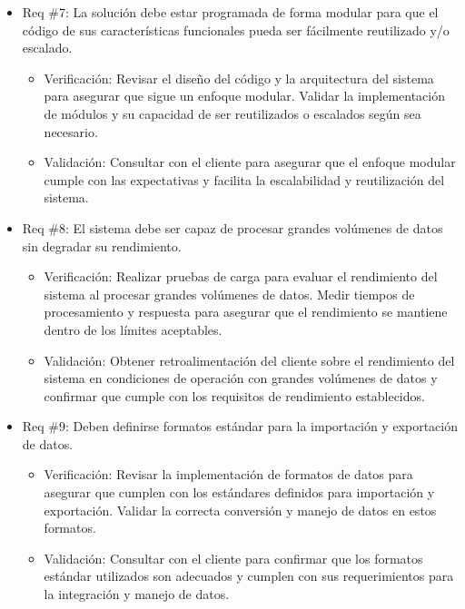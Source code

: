 \documentclass[
11pt, %
codirector, %
]{charter}
\begin{document}
\begin{itemize} 
\item Req \#7: La solución debe estar programada de forma modular para que el código de sus características funcionales pueda ser fácilmente reutilizado y/o escalado.

\begin{itemize}
	\item Verificación: Revisar el diseño del código y la arquitectura del sistema para asegurar que sigue un enfoque modular. Validar la implementación de módulos y su capacidad de ser reutilizados o escalados según sea necesario.
	\item Validación: Consultar con el cliente para asegurar que el enfoque modular cumple con las expectativas y facilita la escalabilidad y reutilización del sistema.
\end{itemize}

\item Req \#8: El sistema debe ser capaz de procesar grandes volúmenes de datos sin degradar su rendimiento.

\begin{itemize}
	\item Verificación: Realizar pruebas de carga para evaluar el rendimiento del sistema al procesar grandes volúmenes de datos. Medir tiempos de procesamiento y respuesta para asegurar que el rendimiento se mantiene dentro de los límites aceptables.
	\item Validación: Obtener retroalimentación del cliente sobre el rendimiento del sistema en condiciones de operación con grandes volúmenes de datos y confirmar que cumple con los requisitos de rendimiento establecidos.
\end{itemize}

\item Req \#9: Deben definirse formatos estándar para la importación y exportación de datos.

\begin{itemize}
	\item Verificación: Revisar la implementación de formatos de datos para asegurar que cumplen con los estándares definidos para importación y exportación. Validar la correcta conversión y manejo de datos en estos formatos.
	\item Validación: Consultar con el cliente para confirmar que los formatos estándar utilizados son adecuados y cumplen con sus requerimientos para la integración y manejo de datos.
\end{itemize}
\end{itemize}
\end{document}
